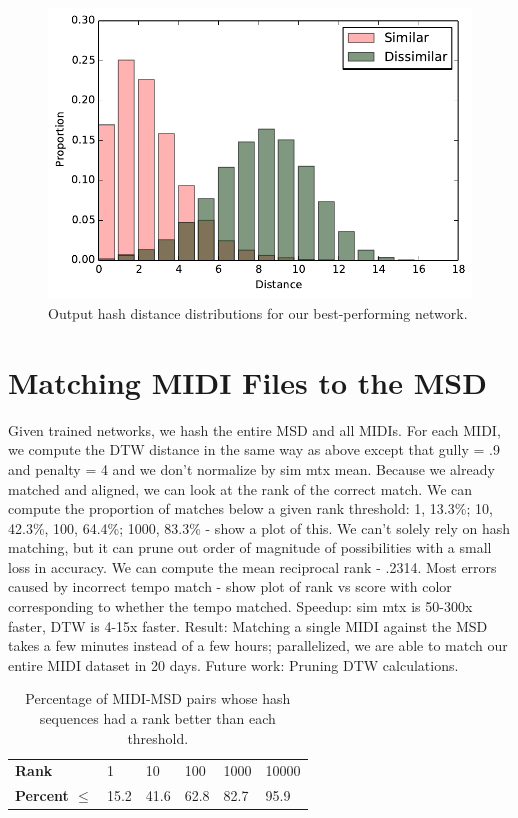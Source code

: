 \documentclass{article}
\begin{document}
\begin{figure}
  \includegraphics[width=\columnwidth]{hash_distributions.pdf}
  \caption{Output hash distance distributions for our best-performing network.}
  \label{fig:distances}
\end{figure}

\section{Matching MIDI Files to the MSD}
\label{sec:msd}

Given trained networks, we hash the entire MSD and all MIDIs.
For each MIDI, we compute the DTW distance in the same way as above except that gully = .9 and penalty = 4 and we don't normalize by sim mtx mean.
Because we already matched and aligned, we can look at the rank of the correct match.
We can compute the proportion of matches below a given rank threshold: 1, 13.3\%; 10, 42.3\%, 100, 64.4\%; 1000, 83.3\% - show a plot of this.
We can't solely rely on hash matching, but it can prune out order of magnitude of possibilities with a small loss in accuracy.
We can compute the mean reciprocal rank - .2314.
Most errors caused by incorrect tempo match - show plot of rank vs score with color corresponding to whether the tempo matched.
Speedup: sim mtx is 50-300x faster, DTW is 4-15x faster.
Result: Matching a single MIDI against the MSD takes a few minutes instead of a few hours; parallelized, we are able to match our entire MIDI dataset in 20 days.
Future work: Pruning DTW calculations.

\begin{table}
  \begin{center}
    \begin{tabular}{@{}llllll@{}}
      \toprule
      \textbf{Rank} & 1 & 10 & 100 & 1000 & 10000 \\
      \textbf{Percent $\le$} & 15.2 & 41.6 & 62.8 & 82.7 & 95.9 \\
      \bottomrule
    \end{tabular}
  \end{center}
  \caption{Percentage of MIDI-MSD pairs whose hash sequences had a rank better than each threshold.}
  \label{tab:rank-percentages}
\end{table}


\end{document}
